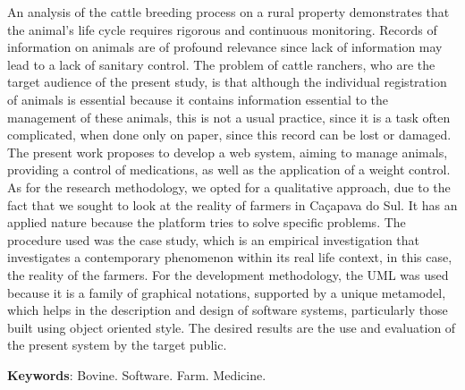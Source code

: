 %
%

\begin{ABSTRACT}
	\begin{SingleSpace}
	
		\hspace{-1.2 cm}  An analysis of the cattle breeding process on a rural property demonstrates that the animal's life cycle requires rigorous and continuous monitoring. Records of information on animals are of profound relevance since lack of information may lead to a lack of sanitary control. The problem of cattle ranchers, who are the target audience of the present study, is that although the individual registration of animals is essential because it contains information essential to the management of these animals, this is not a usual practice, since it is a task often complicated, when done only on paper, since this record can be lost or damaged. The present work proposes to develop a web system, aiming to manage animals, providing a control of medications, as well as the application of a weight control. As for the research methodology, we opted for a qualitative approach, due to the fact that we sought to look at the reality of farmers in Caçapava do Sul. It has an applied nature because the platform tries to solve specific problems. The procedure used was the case study, which is an empirical investigation that investigates a contemporary phenomenon within its real life context, in this case, the reality of the farmers. For the development methodology, the UML was used because it is a family of graphical notations, supported by a unique metamodel, which helps in the description and design of software systems, particularly those built using object oriented style. The desired results are the use and evaluation of the present system by the target public.

		\vspace*{0.5cm}\hspace{-1.3 cm}\textbf{Keywords}: Bovine. Software. Farm. Medicine.
		
		
	\end{SingleSpace}

\end{ABSTRACT}
